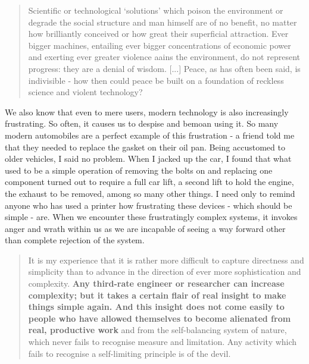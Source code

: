 \documentclass[letterpaper]{article}
\begin{document}
\begin{quote}
  Scientific or technological `solutions' which poison the environment or degrade the social structure and man himself are of no benefit, no matter how brilliantly conceived or how great their superficial attraction. Ever bigger machines, entailing ever bigger concentrations of economic power and exerting ever greater violence aains the environment, do not represent progress: they are a denial of wisdom. [...] Peace, as has often been said, is indivisible - how then could peace be built on a foundation of reckless science and violent technology?
\end{quote}

We also know that even to mere users, modern technology is also increasingly frustrating. So often, it causes us to despise and bemoan using it. So many modern automobiles are a perfect example of this frustration - a friend told me that they needed to replace the gasket on their oil pan. Being accustomed to older vehicles, I said no problem. When I jacked up the car, I found that what used to be a simple operation of removing the bolts on and replacing one component turned out to require a full car lift, a second lift to hold the engine, the exhaust to be removed, among so many other things. I need only to remind anyone who has used a printer how frustrating these devices - which should be simple - are. When we encounter these frustratingly complex systems, it invokes anger and wrath within us as we are incapable of seeing a way forward other than complete rejection of the system.

\begin{quote}
  It is my experience that it is rather more difficult to capture directness and simplicity than to advance in the direction of ever more sophistication and complexity. \textbf{Any third-rate engineer or researcher can increase complexity; but it takes a certain flair of real insight to make things simple again. And this insight does not come easily to people who have allowed themselves to become alienated from real, productive work} and from the self-balancing system of nature, which never fails to recognise measure and limitation. Any activity which fails to recognise a self-limiting principle is of the devil.
\end{quote}

\end{document}

